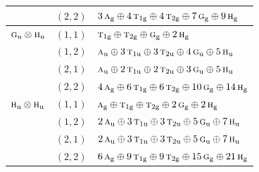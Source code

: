 \documentclass[11pt]{article}
\newcommand{\irr}[1]{\text{\normalfont\scshape #1}}
\newcommand{\ptag}[1]{\mathrm{#1}}
\begin{document}
\begin{longtable}{p{} c p{}}
 & $(2,2)$ & $3\,\irr{a}_{\ptag{g}}\oplus 4\,\irr{t}_{1\ptag{g}}\oplus 4\,\irr{t}_{2\ptag{g}}\oplus 7\,\irr{g}_{\ptag{g}}\oplus 9\,\irr{h}_{\ptag{g}}$\\

\hline

$\irr{g}_{\ptag{u}}\otimes \irr{h}_{\ptag{u}}$ & $(1,1)$ & $\irr{t}_{1\ptag{g}}\oplus \irr{t}_{2\ptag{g}}\oplus \irr{g}_{\ptag{g}}\oplus 2\,\irr{h}_{\ptag{g}}$\\

 & $(1,2)$ & $\irr{a}_{\ptag{u}}\oplus 3\,\irr{t}_{1\ptag{u}}\oplus 3\,\irr{t}_{2\ptag{u}}\oplus 4\,\irr{g}_{\ptag{u}}\oplus 5\,\irr{h}_{\ptag{u}}$\\

 & $(2,1)$ & $\irr{a}_{\ptag{u}}\oplus 2\,\irr{t}_{1\ptag{u}}\oplus 2\,\irr{t}_{2\ptag{u}}\oplus 3\,\irr{g}_{\ptag{u}}\oplus 5\,\irr{h}_{\ptag{u}}$\\

 & $(2,2)$ & $4\,\irr{a}_{\ptag{g}}\oplus 6\,\irr{t}_{1\ptag{g}}\oplus 6\,\irr{t}_{2\ptag{g}}\oplus 10\,\irr{g}_{\ptag{g}}\oplus 14\,\irr{h}_{\ptag{g}}$\\

\hline

$\irr{h}_{\ptag{u}}\otimes \irr{h}_{\ptag{u}}$ & $(1,1)$ & $\irr{a}_{\ptag{g}}\oplus \irr{t}_{1\ptag{g}}\oplus \irr{t}_{2\ptag{g}}\oplus 2\,\irr{g}_{\ptag{g}}\oplus 2\,\irr{h}_{\ptag{g}}$\\

 & $(1,2)$ & $2\,\irr{a}_{\ptag{u}}\oplus 3\,\irr{t}_{1\ptag{u}}\oplus 3\,\irr{t}_{2\ptag{u}}\oplus 5\,\irr{g}_{\ptag{u}}\oplus 7\,\irr{h}_{\ptag{u}}$\\

 & $(2,1)$ & $2\,\irr{a}_{\ptag{u}}\oplus 3\,\irr{t}_{1\ptag{u}}\oplus 3\,\irr{t}_{2\ptag{u}}\oplus 5\,\irr{g}_{\ptag{u}}\oplus 7\,\irr{h}_{\ptag{u}}$\\

 & $(2,2)$ & $6\,\irr{a}_{\ptag{g}}\oplus 9\,\irr{t}_{1\ptag{g}}\oplus 9\,\irr{t}_{2\ptag{g}}\oplus 15\,\irr{g}_{\ptag{g}}\oplus 21\,\irr{h}_{\ptag{g}}$\\

\hline

\end{longtable}
\end{document}
